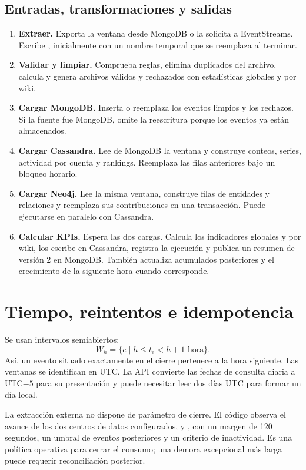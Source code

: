 \subsection{Entradas, transformaciones y salidas}
\begin{enumerate}
\item \textbf{Extraer.} Exporta la ventana desde MongoDB o la solicita a EventStreams. Escribe , inicialmente con un nombre temporal que se reemplaza al terminar.
\item \textbf{Validar y limpiar.} Comprueba reglas, elimina duplicados del archivo, calcula  y genera archivos válidos y rechazados con estadísticas globales y por wiki.
\item \textbf{Cargar MongoDB.} Inserta o reemplaza los eventos limpios y los rechazos. Si la fuente fue MongoDB, omite la reescritura porque los eventos ya están almacenados.
\item \textbf{Cargar Cassandra.} Lee de MongoDB la ventana y construye conteos, series, actividad por cuenta y rankings. Reemplaza las filas anteriores bajo un bloqueo horario.
\item \textbf{Cargar Neo4j.} Lee la misma ventana, construye filas de entidades y relaciones y reemplaza sus contribuciones en una transacción. Puede ejecutarse en paralelo con Cassandra.
\item \textbf{Calcular KPIs.} Espera las dos cargas. Calcula los indicadores globales y por wiki, los escribe en Cassandra, registra la ejecución y publica un resumen de versión 2 en MongoDB. También actualiza acumulados posteriores y el crecimiento de la siguiente hora cuando corresponde.
\end{enumerate}

\section{Tiempo, reintentos e idempotencia}
Se usan intervalos semiabiertos:
\[
W_h=\{e\mid h\leq t_e<h+1\text{ hora}\}.
\]
Así, un evento situado exactamente en el cierre pertenece a la hora siguiente. Las ventanas se identifican en UTC. La API convierte las fechas de consulta diaria a UTC$-5$ para su presentación y puede necesitar leer dos días UTC para formar un día local.

La extracción externa no dispone de parámetro de cierre. El código observa el avance de los dos centros de datos configurados,  y , con un margen de 120 segundos, un umbral de eventos posteriores y un criterio de inactividad. Es una política operativa para cerrar el consumo; una demora excepcional más larga puede requerir reconciliación posterior.

